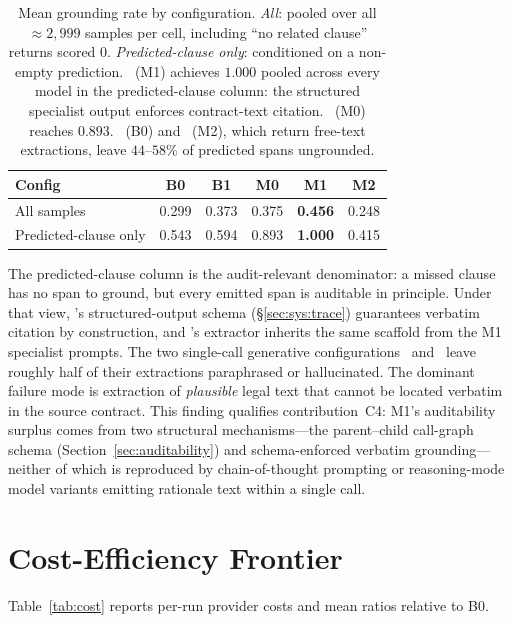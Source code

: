 \begin{table}[htbp]
  \centering
  \small
  \caption{Mean grounding rate by configuration. \emph{All}: pooled over all
  $\approx\!2{,}999$ samples per cell, including ``no related clause'' returns
  scored $0$. \emph{Predicted-clause only}: conditioned on a non-empty
  prediction. \cfgMA\ (M1) achieves $1.000$ pooled across every model in the
  predicted-clause column: the structured specialist output enforces
  contract-text citation. \cfgCX\ (M0) reaches $0.893$. \cfgZS\ (B0) and
  \cfgCP\ (M2), which return free-text extractions, leave $44$--$58\%$ of
  predicted spans ungrounded.}
  \label{tab:grounding}
  \begin{tabular*}{\linewidth}{@{\extracolsep{\fill}}lccccc@{}}
    \toprule
    \textbf{Config} & \textbf{B0} & \textbf{B1} & \textbf{M0} & \textbf{M1} & \textbf{M2} \\
    \midrule
    All samples            & 0.299 & 0.373 & 0.375 & \textbf{0.456} & 0.248 \\
    Predicted-clause only  & 0.543 & 0.594 & 0.893 & \textbf{1.000} & 0.415 \\
    \bottomrule
  \end{tabular*}
\end{table}

The predicted-clause column is the audit-relevant denominator: a missed clause
has no span to ground, but every emitted span is auditable in principle. Under
that view, \cfgMA's structured-output schema (\S\ref{sec:sys:trace})
guarantees verbatim citation by construction, and \cfgCX's extractor inherits
the same scaffold from the M1 specialist prompts. The two single-call
generative configurations \cfgZS\ and \cfgCP\ leave roughly half of their
extractions paraphrased or hallucinated. The dominant failure mode is
extraction of \emph{plausible} legal text that cannot be located verbatim
in the source contract. This finding qualifies contribution~C4: M1's
auditability surplus comes from two structural mechanisms---the
parent--child call-graph schema (Section~\ref{sec:auditability}) and
schema-enforced verbatim grounding---neither of which is reproduced by
chain-of-thought prompting or reasoning-mode model variants emitting
rationale text within a single call.

\section{Cost-Efficiency Frontier}\label{sec:res:cost}

Table~\ref{tab:cost} reports per-run provider costs and mean ratios relative to
B0.

